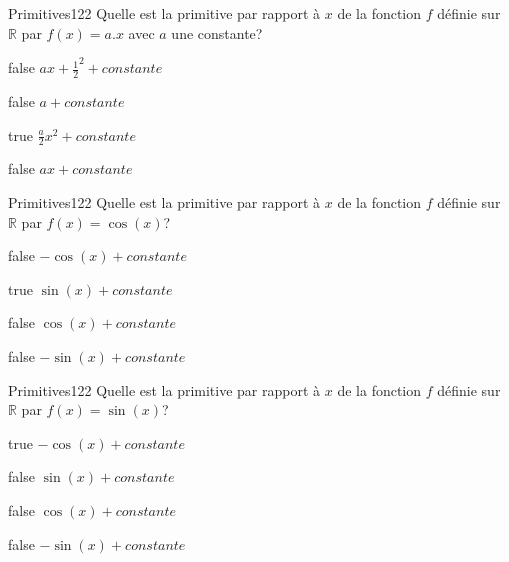 \documentclass[11pt]{article}
\begin{document}
        	\begin{question}{61}{Primitives}{1}{22}
				Quelle est la primitive par rapport à $x$ de la fonction $f$ définie sur $\mathbb{R}$ par $f(x)=a.x$ avec $a$ une constante?
            \end{question}

            \begin{reponses}
            	\item[false] $ax+\frac{1}{2}^2+constante$
            	\item[false] $a+constante$
                \item[true] $\frac{a}{2}x^2+constante$
                \item[false] $ax+constante$
            \end{reponses}
        
        	\begin{question}{61}{Primitives}{1}{22}
				Quelle est la primitive par rapport à $x$ de la fonction $f$ définie sur $\mathbb{R}$ par $f(x)=\cos(x)$?
            \end{question}

            \begin{reponses}
            	\item[false] $-\cos(x)+constante$
            	\item[true] $\sin(x)+constante$
                \item[false] $\cos(x)+constante$
                \item[false] $-\sin(x)+constante$
            \end{reponses}
        
        	\begin{question}{61}{Primitives}{1}{22}
				Quelle est la primitive par rapport à $x$ de la fonction $f$ définie sur $\mathbb{R}$ par $f(x)=\sin(x)$?
            \end{question}

            \begin{reponses}
            	\item[true] $-\cos(x)+constante$
            	\item[false] $\sin(x)+constante$
                \item[false] $\cos(x)+constante$
                \item[false] $-\sin(x)+constante$
            \end{reponses}
        
\end{document}
